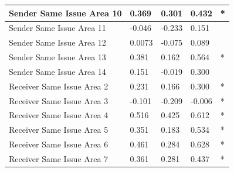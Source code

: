 \documentclass[headsepline=true, abstracton]{scrartcl}
\begin{document}
\begin{table}[H]
\begin{tabular}{|
>{\columncolor[HTML]{EFEFEF}}l |l|l|l|l|}
Sender Same Issue Area 10                          & 0.369                            & 0.301                               & 0.432                               & *                                    \\ \hline
Sender Same Issue Area 11                          & -0.046                           & -0.233                              & 0.151                               &                                      \\ \hline
Sender Same Issue Area 12                          & 0.0073                           & -0.075                              & 0.089                               &                                      \\ \hline
Sender Same Issue Area 13                          & 0.381                            & 0.162                               & 0.564                               & *                                    \\ \hline
Sender Same Issue Area 14                          & 0.151                            & -0.019                              & 0.300                               &                                      \\ \hline
Receiver Same Issue Area 2                         & 0.231                            & 0.166                               & 0.300                               & *                                    \\ \hline
Receiver Same Issue Area 3                         & -0.101                           & -0.209                              & -0.006                              & *                                    \\ \hline
Receiver Same Issue Area 4                         & 0.516                            & 0.425                               & 0.612                               & *                                    \\ \hline
Receiver Same Issue Area 5                         & 0.351                            & 0.183                               & 0.534                               & *                                    \\ \hline
Receiver Same Issue Area 6                         & 0.461                            & 0.284                               & 0.628                               & *                                    \\ \hline
Receiver Same Issue Area 7                         & 0.361                            & 0.281                               & 0.437                               & *                                    \\ \hline

\end{tabular}
\end{table}
\end{document}
